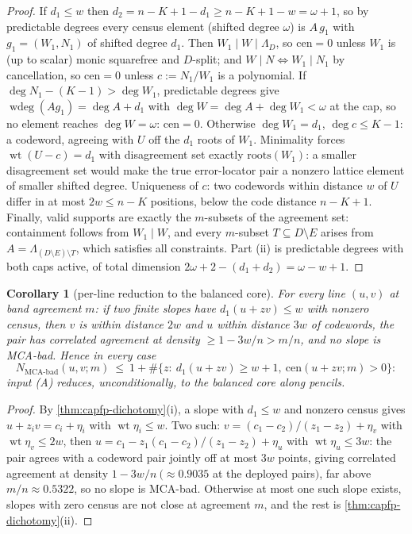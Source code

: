 \documentclass[11pt]{article}
\newtheorem{corollary}[corollary]{Corollary}
\theoremstyle{definition}
\theoremstyle{remark}
\begin{document}
\begin{proof}
If $d_1\le w$ then $d_2=n-K+1-d_1\ge n-K+1-w=\omega+1$, so by predictable degrees every census element \textup(shifted degree $\omega$\textup) is $A\,g_1$ with $g_1=(W_1,N_1)$ of shifted degree $d_1$.  Then $W_1\mid W\mid\Lambda_D$, so $\mathrm{cen}=0$ unless $W_1$ is \textup(up to scalar\textup) monic squarefree and $D$-split; and $W\mid N\iff W_1\mid N_1$ by cancellation, so $\mathrm{cen}=0$ unless $c:=N_1/W_1$ is a polynomial.  If $\deg N_1-(K-1)>\deg W_1$, predictable degrees give $\operatorname{wdeg}(Ag_1)=\deg A+d_1$ with $\deg W=\deg A+\deg W_1<\omega$ at the cap, so no element reaches $\deg W=\omega$: $\mathrm{cen}=0$.  Otherwise $\deg W_1=d_1$, $\deg c\le K-1$: a codeword, agreeing with $U$ off the $d_1$ roots of $W_1$.  Minimality forces $\operatorname{wt}(U-c)=d_1$ with disagreement set exactly $\mathrm{roots}(W_1)$: a smaller disagreement set would make the true error-locator pair a nonzero lattice element of smaller shifted degree.  Uniqueness of $c$: two codewords within distance $w$ of $U$ differ in at most $2w\le n-K$ positions, below the code distance $n-K+1$.  Finally, valid supports are exactly the $m$-subsets of the agreement set: containment follows from $W_1\mid W$, and every $m$-subset $T\subseteq D\setminus E$ arises from $A=\Lambda_{(D\setminus E)\setminus T}$, which satisfies all constraints.  Part \textup{(ii)} is predictable degrees with both caps active, of total dimension $2\omega+2-(d_1+d_2)=\omega-w+1$.
\end{proof}

\begin{corollary}[per-line reduction to the balanced core]\label{cor:capfp-line}
For every line $(u,v)$ at band agreement $m$: if two finite slopes have $d_1(u+zv)\le w$ with nonzero census, then $v$ is within distance $2w$ and $u$ within distance $3w$ of codewords, the pair has correlated agreement at density $\ge1-3w/n>m/n$, and \emph{no} slope is MCA-bad.  Hence in every case
\[
        N_{\mathrm{MCA\text{-}bad}}(u,v;m)\ \le\ 1+\#\bigl\{z:\ d_1(u+zv)\ge w+1,\ \mathrm{cen}(u+zv;m)>0\bigr\}:
\]
input \textup{(A)} reduces, unconditionally, to the balanced core along pencils.
\end{corollary}

\begin{proof}
By \cref{thm:capfp-dichotomy}\textup{(i)}, a slope with $d_1\le w$ and nonzero census gives $u+z_iv=c_i+\eta_i$ with $\operatorname{wt}\eta_i\le w$.  Two such: $v=(c_1-c_2)/(z_1-z_2)+\eta_v$ with $\operatorname{wt}\eta_v\le2w$, then $u=c_1-z_1(c_1-c_2)/(z_1-z_2)+\eta_u$ with $\operatorname{wt}\eta_u\le3w$: the pair agrees with a codeword pair jointly off at most $3w$ points, giving correlated agreement at density $1-3w/n\ (\approx0.9035$ at the deployed pairs$)$, far above $m/n\approx0.5322$, so no slope is MCA-bad.  Otherwise at most one such slope exists, slopes with zero census are not close at agreement $m$, and the rest is \cref{thm:capfp-dichotomy}\textup{(ii)}.
\end{proof}
\end{document}
